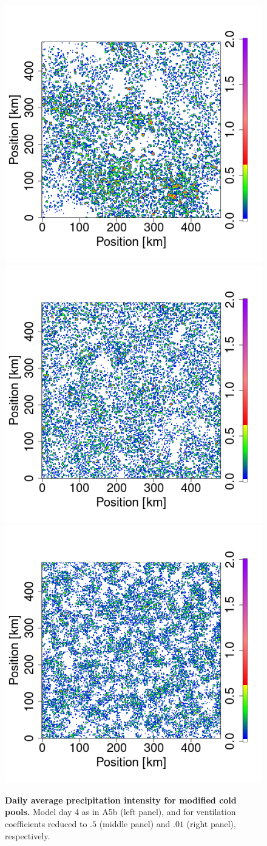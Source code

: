 \documentclass[draft,linenumbers]{agujournal2019}
\begin{document}
\begin{figure}[ht]
\centering
\includegraphics[trim={2cm 2.4cm 1cm 1cm}, clip, height=0.11\linewidth]{var1_daymean_T0_300K_ampl_10_1km_909-1176.png}
\includegraphics[trim={2cm 2.4cm 1cm 1cm}, clip, height=0.11\linewidth]{var1_daymean_T0_300K_ampl_10_1km_05vent_433-576.png}
\includegraphics[trim={2cm 2.4cm 1cm 1cm}, clip, height=0.11\linewidth]{var1_daymean_T0_300K_ampl_10_1km_001vent_433-576.png}
\caption{{\bf Daily average precipitation intensity for modified cold pools.} 
Model day 4 as in A5b (left panel), and for ventilation coefficients reduced to $.5$ (middle panel) and $.01$ (right panel), respectively.}
\label{fig:daily_sum_vent}
\end{figure}
\end{document}
